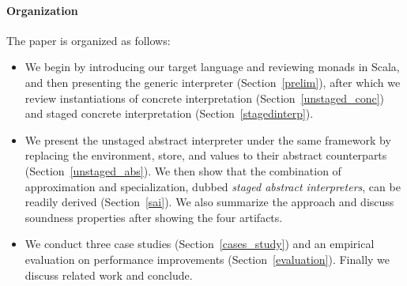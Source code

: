 \paragraph{Organization} The paper is organized as follows:
\begin{itemize}[leftmargin=2em]
  \item We begin by introducing our target language and reviewing
    monads in Scala, and then presenting the generic interpreter
    (Section~\ref{prelim}), after which we review instantiations
    of concrete interpretation (Section~\ref{unstaged_conc}) and
    staged concrete interpretation (Section~\ref{stagedinterp}).
  \item We present the unstaged abstract interpreter under the same
    framework by replacing the environment, store, and values to their
    abstract counterparts (Section~\ref{unstaged_abs}). We then
    show that the combination of approximation and specialization, dubbed
    \textit{staged abstract interpreters}, can be readily derived
    (Section~\ref{sai}). We also summarize the approach and discuss
    soundness properties after showing the four artifacts.
  \item We conduct three case studies (Section~\ref{cases_study}) and
    an empirical evaluation on performance improvements (Section~\ref{evaluation}).
    Finally we discuss related work and conclude.
\end{itemize}

\iffalse
On the other side, static analysis is a trade-off between performance and
precision: higher precision usually leads to longer running time.

4. Existing method to improve the performance is adhoc, engineering heavy, require to rewrite the optimized version, therefore harder to reason about the correctness
6. program analyzers are also meta-programs, they manipulate other programs as data objects
\fi
